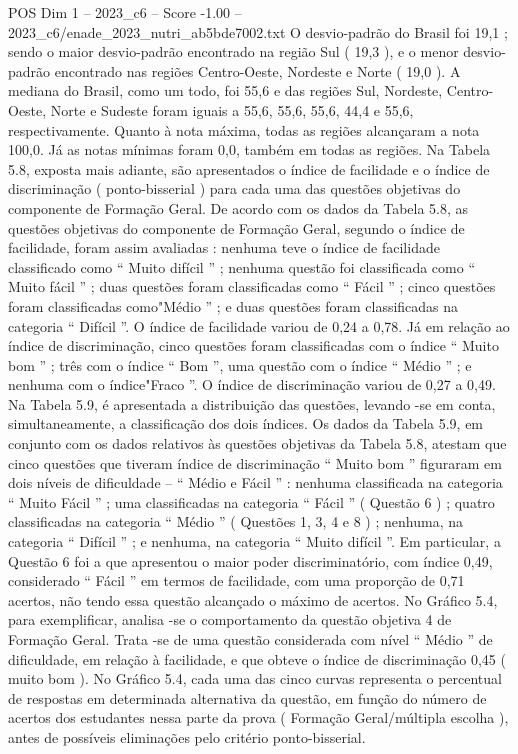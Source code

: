 \begin{textsample}{POS Dim 1 – 2023\_c6 – Score -1.00 – 2023\_c6/enade\_2023\_nutri\_ab5bde7002.txt}
O desvio-padrão do Brasil foi 19,1 ; sendo o maior desvio-padrão encontrado na região Sul ( 19,3 ), e o menor desvio-padrão encontrado nas regiões Centro-Oeste, Nordeste e Norte ( 19,0 ).
A mediana do Brasil, como um todo, foi 55,6 e das regiões Sul, Nordeste, Centro-Oeste, Norte e Sudeste foram iguais a 55,6, 55,6, 55,6, 44,4 e 55,6, respectivamente.
Quanto à nota máxima, todas as regiões alcançaram a nota 100,0.
Já as notas mínimas foram 0,0, também em todas as regiões.
Na Tabela 5.8, exposta mais adiante, são apresentados o índice de facilidade e o índice de discriminação ( ponto-bisserial ) para cada uma das questões objetivas do componente de Formação Geral.
De acordo com os dados da Tabela 5.8, as questões objetivas do componente de Formação Geral, segundo o índice de facilidade, foram assim avaliadas : nenhuma teve o índice de facilidade classificado como “ Muito difícil ” ; nenhuma questão foi classificada como “ Muito fácil ” ; duas questões foram classificadas como “ Fácil ” ; cinco questões foram classificadas como"Médio ” ; e duas questões foram classificadas na categoria “ Difícil ”.
O índice de facilidade variou de 0,24 a 0,78.
Já em relação ao índice de discriminação, cinco questões foram classificadas com o índice “ Muito bom ” ; três com o índice “ Bom ”, uma questão com o índice “ Médio ” ; e nenhuma com o índice"Fraco ”.
O índice de discriminação variou de 0,27 a 0,49.
Na Tabela 5.9, é apresentada a distribuição das questões, levando -se em conta, simultaneamente, a classificação dos dois índices.
Os dados da Tabela 5.9, em conjunto com os dados relativos às questões objetivas da Tabela 5.8, atestam que cinco questões que tiveram índice de discriminação “ Muito bom ” figuraram em dois níveis de dificuldade – “ Médio e Fácil ” : nenhuma classificada na categoria “ Muito Fácil ” ; uma classificadas na categoria “ Fácil ” ( Questão 6 ) ; quatro classificadas na categoria “ Médio ” ( Questões 1, 3, 4 e 8 ) ; nenhuma, na categoria “ Difícil ” ; e nenhuma, na categoria “ Muito difícil ”.
Em particular, a Questão 6 foi a que apresentou o maior poder discriminatório, com índice 0,49, considerado “ Fácil ” em termos de facilidade, com uma proporção de 0,71 acertos, não tendo essa questão alcançado o máximo de acertos.
No Gráfico 5.4, para exemplificar, analisa -se o comportamento da questão objetiva 4 de Formação Geral.
Trata -se de uma questão considerada com nível “ Médio ” de dificuldade, em relação à facilidade, e que obteve o índice de discriminação 0,45 ( muito bom ).
No Gráfico 5.4, cada uma das cinco curvas representa o percentual de respostas em determinada alternativa da questão, em função do número de acertos dos estudantes nessa parte da prova ( Formação Geral/múltipla escolha ), antes de possíveis eliminações pelo critério ponto-bisserial.

\end{textsample}
